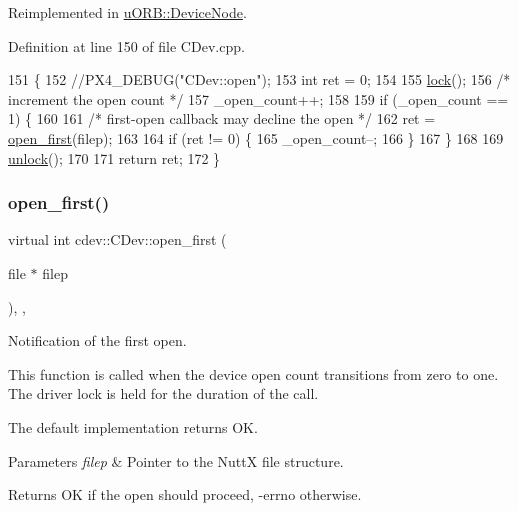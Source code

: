 Reimplemented in \hyperlink{classuORB_1_1DeviceNode_ae7f3782c9876a17b4aa6949440655f1f}{u\+O\+R\+B\+::\+Device\+Node}.



Definition at line 150 of file C\+Dev.\+cpp.


\begin{DoxyCode}
151 \{
152     \textcolor{comment}{//PX4\_DEBUG("CDev::open");}
153     \textcolor{keywordtype}{int} ret = 0;
154 
155     \hyperlink{classcdev_1_1CDev_ae676cccee31dd393ab681414a146d868}{lock}();
156     \textcolor{comment}{/* increment the open count */}
157     \_open\_count++;
158 
159     \textcolor{keywordflow}{if} (\_open\_count == 1) \{
160 
161         \textcolor{comment}{/* first-open callback may decline the open */}
162         ret = \hyperlink{classcdev_1_1CDev_a89860de90cb8850c1ac71ec59764cf46}{open\_first}(filep);
163 
164         \textcolor{keywordflow}{if} (ret != 0) \{
165             \_open\_count--;
166         \}
167     \}
168 
169     \hyperlink{classcdev_1_1CDev_af65273e0578b277deea057dc7d558e9d}{unlock}();
170 
171     \textcolor{keywordflow}{return} ret;
172 \}
\end{DoxyCode}
\mbox{\label{classcdev_1_1CDev_a89860de90cb8850c1ac71ec59764cf46}} 
\subsubsection{\texorpdfstring{open\+\_\+first()}{open\_first()}}
{\footnotesize\ttfamily virtual int cdev\+::\+C\+Dev\+::open\+\_\+first (\begin{DoxyParamCaption}\item[{file $\ast$}]{filep }\end{DoxyParamCaption})\hspace{0.3cm}{\ttfamily [inline]}, {\ttfamily [protected]}, {\ttfamily [virtual]}}

Notification of the first open.

This function is called when the device open count transitions from zero to one. The driver lock is held for the duration of the call.

The default implementation returns OK.


\begin{DoxyParams}{Parameters}
{\em filep} & Pointer to the NuttX file structure. \\
\hline
\end{DoxyParams}
\begin{DoxyReturn}{Returns}
OK if the open should proceed, -\/errno otherwise. 
\end{DoxyReturn}


